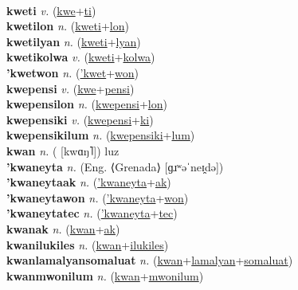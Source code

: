  \label{'kwetak} \\
\textbf{kweti} \textit{v.} (\hyperref[kwe]{kwe}+\hyperref[ti]{ti})
 \label{kweti} \\
\textbf{kwetilon} \textit{n.} (\hyperref[kweti]{kweti}+\hyperref[lon]{lon})
 \label{kwetilon} \\
\textbf{kwetilyan} \textit{n.} (\hyperref[kweti]{kweti}+\hyperref[lyan]{lyan})
 \label{kwetilyan} \\
\textbf{kwetikolwa} \textit{v.} (\hyperref[kweti]{kweti}+\hyperref[kolwa]{kolwa})
 \label{kwetikolwa} \\
\textbf{'kwetwon} \textit{n.} (\hyperref['kwet]{'kwet}+\hyperref[won]{won})
 \label{'kwetwon} \\
\textbf{kwepensi} \textit{v.} (\hyperref[kwe]{kwe}+\hyperref[pensi]{pensi})
 \label{kwepensi} \\
\textbf{kwepensilon} \textit{n.} (\hyperref[kwepensi]{kwepensi}+\hyperref[lon]{lon})
 \label{kwepensilon} \\
\textbf{kwepensiki} \textit{v.} (\hyperref[kwepensi]{kwepensi}+\hyperref[ki]{ki})
 \label{kwepensiki} \\
\textbf{kwepensikilum} \textit{n.} (\hyperref[kwepensiki]{kwepensiki}+\hyperref[lum]{lum})
 \label{kwepensikilum} \\
\textbf{kwan} \textit{n.} ( [kwɑŋ˥])
luz \label{kwan} \\
\textbf{'kwaneyta} \textit{n.} (Eng. ⟨Grenada⟩ [ɡɹʷəˈneɪ̯də])
 \label{'kwaneyta} \\
\textbf{'kwaneytaak} \textit{n.} (\hyperref['kwaneyta]{'kwaneyta}+\hyperref[ak]{ak})
 \label{'kwaneytaak} \\
\textbf{'kwaneytawon} \textit{n.} (\hyperref['kwaneyta]{'kwaneyta}+\hyperref[won]{won})
 \label{'kwaneytawon} \\
\textbf{'kwaneytatec} \textit{n.} (\hyperref['kwaneyta]{'kwaneyta}+\hyperref[tec]{tec})
 \label{'kwaneytatec} \\
\textbf{kwanak} \textit{n.} (\hyperref[kwan]{kwan}+\hyperref[ak]{ak})
 \label{kwanak} \\
\textbf{kwanilukiles} \textit{n.} (\hyperref[kwan]{kwan}+\hyperref[ilukiles]{ilukiles})
 \label{kwanilukiles} \\
\textbf{kwanlamalyansomaluat} \textit{n.} (\hyperref[kwan]{kwan}+\hyperref[lamalyan]{lamalyan}+\hyperref[somaluat]{somaluat})
 \label{kwanlamalyansomaluat} \\
\textbf{kwanmwonilum} \textit{n.} (\hyperref[kwan]{kwan}+\hyperref[mwonilum]{mwonilum})
 \label{kwanmwonilum} \\
